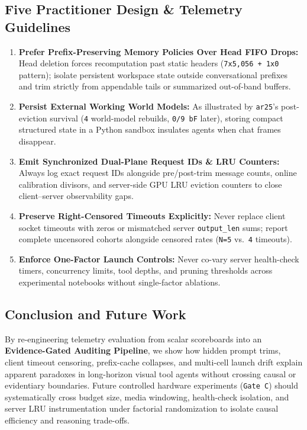 \documentclass[10pt]{article}
\newcommand{\code}[1]{\texttt{#1}}
\begin{document}
\subsection{Five Practitioner Design \& Telemetry Guidelines}
\begin{enumerate}[leftmargin=1.4em,itemsep=2pt]
\item \textbf{Prefer Prefix-Preserving Memory Policies Over Head FIFO Drops:} Head deletion forces recomputation past static headers (\code{7x5,056 + 1x0} pattern); isolate persistent workspace state outside conversational prefixes and trim strictly from appendable tails or summarized out-of-band buffers.
\item \textbf{Persist External Working World Models:} As illustrated by \code{ar25}'s post-eviction survival (\code{4} world-model rebuilds, \code{0/9 bF} later), storing compact structured state in a Python sandbox insulates agents when chat frames disappear.
\item \textbf{Emit Synchronized Dual-Plane Request IDs \& LRU Counters:} Always log exact request IDs alongside pre/post-trim message counts, online calibration divisors, and server-side GPU LRU eviction counters to close client--server observability gaps.
\item \textbf{Preserve Right-Censored Timeouts Explicitly:} Never replace client socket timeouts with zeros or mismatched server \code{output\_len} sums; report complete uncensored cohorts alongside censored rates (\code{N=5} vs.\ \code{4} timeouts).
\item \textbf{Enforce One-Factor Launch Controls:} Never co-vary server health-check timers, concurrency limits, tool depths, and pruning thresholds across experimental notebooks without single-factor ablations.
\end{enumerate}

\subsection{Conclusion and Future Work}
By re-engineering telemetry evaluation from scalar scoreboards into an \textbf{Evidence-Gated Auditing Pipeline}, we show how hidden prompt trims, client timeout censoring, prefix-cache collapses, and multi-cell launch drift explain apparent paradoxes in long-horizon visual tool agents without crossing causal or evidentiary boundaries. Future controlled hardware experiments (\code{Gate C}) should systematically cross budget size, media windowing, health-check isolation, and server LRU instrumentation under factorial randomization to isolate causal efficiency and reasoning trade-offs.
\end{document}
